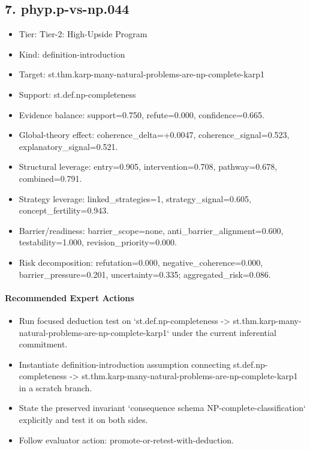 \documentclass[11pt]{article}
\begin{document}
\subsection*{7. phyp.p-vs-np.044}
\begin{itemize}
\item Tier: Tier-2: High-Upside Program
\item Kind: definition-introduction
\item Target: st.thm.karp-many-natural-problems-are-np-complete-karp1
\item Support: st.def.np-completeness
\item Evidence balance: support=0.750, refute=0.000, confidence=0.665.
\item Global-theory effect: coherence\_delta=+0.0047, coherence\_signal=0.523, explanatory\_signal=0.521.
\item Structural leverage: entry=0.905, intervention=0.708, pathway=0.678, combined=0.791.
\item Strategy leverage: linked\_strategies=1, strategy\_signal=0.605, concept\_fertility=0.943.
\item Barrier/readiness: barrier\_scope=none, anti\_barrier\_alignment=0.600, testability=1.000, revision\_priority=0.000.
\item Risk decomposition: refutation=0.000, negative\_coherence=0.000, barrier\_pressure=0.201, uncertainty=0.335; aggregated\_risk=0.086.
\end{itemize}
\paragraph{Recommended Expert Actions}
\begin{itemize}
\item Run focused deduction test on `st.def.np-completeness -> st.thm.karp-many-natural-problems-are-np-complete-karp1` under the current inferential commitment.
\item Instantiate definition-introduction assumption connecting st.def.np-completeness -> st.thm.karp-many-natural-problems-are-np-complete-karp1 in a scratch branch.
\item State the preserved invariant `consequence schema NP-complete-classification` explicitly and test it on both sides.
\item Follow evaluator action: promote-or-retest-with-deduction.
\end{itemize}
\end{document}

